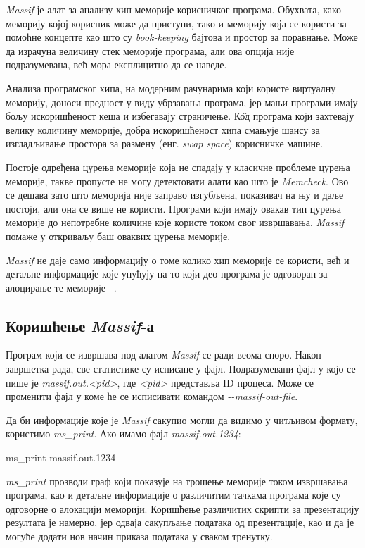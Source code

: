 \documentclass[12pt,oneside]{memoir}
\begin{document}
\indent \textit{Massif} је алат за анализу хип меморије корисничког програма. Обухвата, како меморију којој корисник може да приступи, тако и меморију која се користи за помоћне концепте као што су \textit{book-keeping} бајтова и простор за поравнање. Може да израчуна величину стек меморије програма, али ова опција није подразумевана, већ мора експлицитно да се наведе.

\indent Анализа програмског хипа, на модерним рачунарима који користе виртуалну меморију, доноси предност у виду убрзавања програма, јер мањи програми имају бољу искоришћеност кеша и избегавају страничење. К\^{о}д програма који захтевају велику количину меморије, добра искоришћеност хипа смањује шансу за изгладљивање простора за размену (енг. \textit{swap space}) корисничке машине.

\indent Постоје одређена цурења меморије која не спадају у класичне проблеме цурења меморије, такве пропусте не могу детектовати алати као што је \textit{Memcheck}. Ово се дешава зато што меморија није заправо изгубљена, показивач на њу и даље постоји, али она се више не користи. Програми који имају овакав тип цурења меморије до непотребне количине које користе током свог извршавања. \textit{Massif} помаже у откриваљу баш оваквих цурења меморије. 

\indent \textit{Massif} не даје само информацију о томе колико хип меморије се користи, већ и детаљне информације које упућују на то који део програма је одговоран за алоцирање те меморије ~\cite{massifdRef}.

\subsection{Коришћење \textit{Massif}-а}


\indent Програм који се извршава под алатом \textit{Massif} се ради веома споро. Након завршетка рада, све статистике су исписане у фајл. Подразумевани фајл у којо се пише је \textit{massif.out.<pid>}, где \textit{<pid>} представља ID процеса. Може се променити фајл у коме ће се исписивати командом \textit{-\--massif-out-file}.

\indent Да би информације које је \textit{Massif} сакупио могли да видимо у читљивом формату, користимо \textit{ms\_print}. Ако имамо фајл \textit{massif.out.1234}: 


\begin{center}
 ms\_print massif.out.1234
\end{center}

\indent \textit{ms\_print} прозводи граф који показује на трошење меморије током извршавања програма, као и детаљне информације о различитим тачкама програма које су одговорне о алокацији меморији. Коришћење различитих скрипти за презентацију резултата је намерно, јер одваја сакупљање података од презентације, као и да је могуће додати нов начин приказа података у сваком тренутку.
\end{document}
